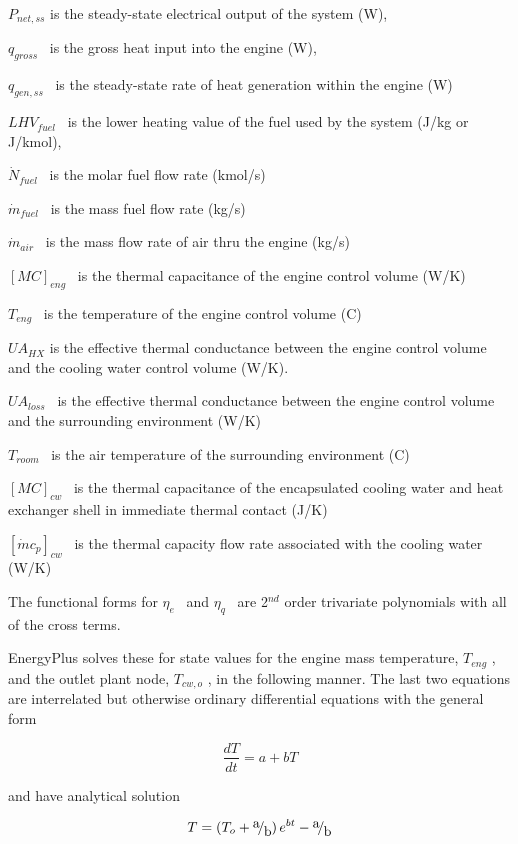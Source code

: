 \({P_{net,ss}}\) is the steady-state electrical output of the system (W),

\({q_{gross}}\) ~is the gross heat input into the engine (W),

\({q_{gen,ss}}\) ~is the steady-state rate of heat generation within the engine (W)

\(LH{V_{fuel}}\) ~is the lower heating value of the fuel used by the system (J/kg or J/kmol),

\({\dot N_{fuel}}\) ~is the molar fuel flow rate (kmol/s)

\({\dot m_{fuel}}\) ~is the mass fuel flow rate (kg/s)

\({\dot m_{air}}\) ~is the mass flow rate of air thru the engine (kg/s)

\({[MC]_{eng}}\) ~is the thermal capacitance of the engine control volume (W/K)

\({T_{eng}}\) ~is the temperature of the engine control volume (C)

\(U{A_{HX}}\) is the effective thermal conductance between the engine control volume and the cooling water control volume (W/K).

\(U{A_{loss}}\) ~is the effective thermal conductance between the engine control volume and the surrounding environment (W/K)

\({T_{room}}\) ~is the air temperature of the surrounding environment (C)

\({[MC]_{cw}}\) ~is the thermal capacitance of the encapsulated cooling water and heat exchanger shell in immediate thermal contact (J/K)

\({[\dot m{c_p}]_{cw}}\) ~is the thermal capacity flow rate associated with the cooling water (W/K)

The functional forms for \({\eta_e}\) ~and \({\eta_q}\) ~are 2\(^{nd}\) order trivariate polynomials with all of the cross terms.

EnergyPlus solves these for state values for the engine mass temperature, \({T_{eng}}\) , and the outlet plant node, \({T_{cw,o}}\) , in the following manner. The last two equations are interrelated but otherwise ordinary differential equations with the general form

\begin{equation}
\frac{{dT}}{{dt}} = a + bT
\end{equation}

and have analytical solution

\begin{equation}
T = \left( {{T_o} + {\raise0.7ex\hbox{a} \!\mathord{\left/ {\vphantom {a b}}\right.}\!\lower0.7ex\hbox{b}}} \right){e^{bt}} - {\raise0.7ex\hbox{a} \!\mathord{\left/ {\vphantom {a b}}\right.}\!\lower0.7ex\hbox{b}}
\end{equation}

